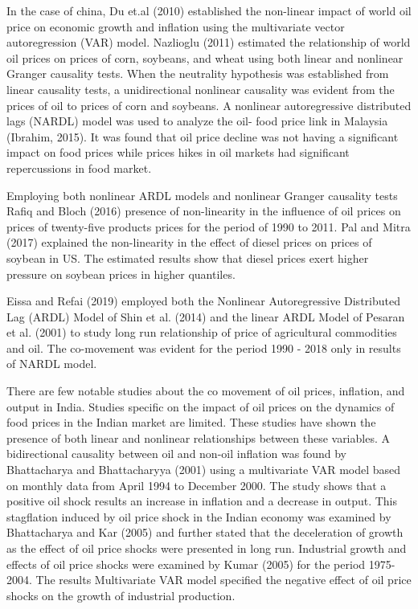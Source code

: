 \documentclass[a4paper,12pt]{article}
\begin{document}
In the case of china, Du et.al (2010) established the non-linear impact of world oil price on economic growth and inflation using the multivariate vector autoregression (VAR) model.
Nazlioglu (2011) estimated the relationship of world oil prices on prices of corn, soybeans, and wheat using both linear and nonlinear Granger causality tests. When the neutrality hypothesis was established from linear causality tests, a unidirectional nonlinear causality was evident from the prices of oil to prices of corn and soybeans.
A nonlinear autoregressive distributed lags (NARDL) model was used to analyze the oil- food price link in Malaysia (Ibrahim, 2015). It was found that oil price decline was not having a significant impact on food prices while prices hikes in oil markets had significant repercussions in food market.

Employing both nonlinear ARDL models and nonlinear Granger causality tests Rafiq and Bloch (2016) presence of non-linearity in the influence of oil prices on prices of twenty-five products prices for the period of 1990 to 2011.
Pal and Mitra (2017) explained the non-linearity in the effect of diesel prices on prices of soybean in US. The estimated results show that diesel prices exert higher pressure on soybean prices in higher quantiles. 

Eissa and Refai (2019) employed both the Nonlinear Autoregressive Distributed Lag (ARDL) Model of Shin et al. (2014) and the linear ARDL Model of Pesaran et al. (2001) to study long run relationship of price of agricultural commodities and oil. The co-movement was evident for the period 1990 - 2018 only in results of NARDL model. 

There are few notable studies about the co movement of oil prices, inflation, and output in India.  Studies specific on the impact of oil prices on the dynamics of food prices in the Indian market are limited.  These studies have shown the presence of both linear and nonlinear relationships between these variables. A bidirectional causality between oil and non-oil inflation was found by Bhattacharya and Bhattacharyya (2001) using a multivariate VAR model based on monthly data from April 1994 to December 2000. The study shows that a positive oil shock results an increase in inflation and a decrease in output. This stagflation induced by oil price shock in the Indian economy was examined by Bhattacharya and Kar (2005) and further stated that the deceleration of growth as the effect of oil price shocks were presented in long run.
Industrial growth and effects of oil price shocks were examined by Kumar (2005) for the period 1975-2004. The results Multivariate VAR model specified the negative effect of oil price shocks on the growth of industrial production.
\end{document}
